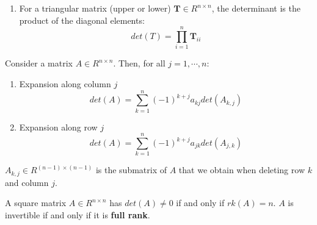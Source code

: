 \begin{enumerate}
    \item For a triangular matrix (upper or lower)  $\mathbf{T} \in R^{n\times n}$, the determinant is the product of the diagonal elements:
    \[
        \displaystyle
        det(T) = \prod_{i=1}^{n} \mathbf{T}_{ii}
    \]
\end{enumerate}

\begin{theorem}
    Consider a matrix $A \in R^{n\times n}$. Then, for all $j = 1, \cdots , n$:
    \begin{enumerate}
        \item Expansion along column $j$
        \[
            \displaystyle
            det(A) = \sum_{k=1}^{n} (-1)^{k+j} a_{kj} det(A_{k,j})
        \]
    
        \item Expansion along row $j$
        \[
            \displaystyle
            det(A) = \sum_{k=1}^{n} (-1)^{k+j} a_{jk} det(A_{j,k})
        \]
    \end{enumerate}

\noindent $A_{k,j} \in R^{(n-1)\times(n-1)}$ is the submatrix of $A$ that we obtain when deleting row $k$ and column $j$.

\end{theorem}

\begin{theorem}
    A square matrix $A \in R^{n\times n}$ has $det(A) \neq 0$ if and only if $rk(A) = n$. $A$ is invertible if and only if it is \textbf{full rank}.
\end{theorem}

